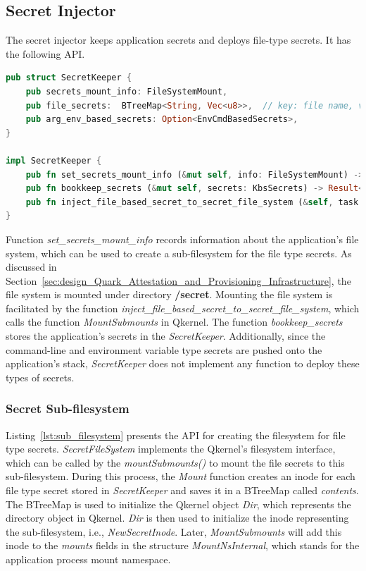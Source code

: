 \subsection{Secret Injector}
The secret injector keeps application secrets and deploys file-type secrets. It has the following API. 
\begin{lstlisting}[language=rust, caption= API for Secret Injector, label={lst:Secret_injector}]
pub struct SecretKeeper {
    pub secrets_mount_info: FileSystemMount,
    pub file_secrets:  BTreeMap<String, Vec<u8>>,  // key: file name, value: secret
    pub arg_env_based_secrets: Option<EnvCmdBasedSecrets>,
}

impl SecretKeeper {
    pub fn set_secrets_mount_info (&mut self, info: FileSystemMount) -> Result<()>
    pub fn bookkeep_secrets (&mut self, secrets: KbsSecrets) -> Result<()>
    pub fn inject_file_based_secret_to_secret_file_system (&self, task: &Task) -> Result<()>
}   
\end{lstlisting}

Function \emph{set\_secrets\_mount\_info} records information about the application's file system, which can be used to create a sub-filesystem for the file type secrets. As discussed in Section~\ref{sec:design_Quark_Attestation_and_Provisioning_Infrastructure}, the file system is mounted under 
directory \textbf{/secret}. Mounting the file system is facilitated by the function \emph{inject\_file\_based\_secret\_to\_secret\_file\_system}, which calls the function \emph{MountSubmounts} in Qkernel. The function \emph{bookkeep\_secrets} stores the application's secrets in the \emph{SecretKeeper}. 
Additionally, since the command-line and environment variable type secrets are pushed onto the application's stack,  \emph{SecretKeeper} does not implement any function to deploy these types of secrets.

\subsubsection{Secret Sub-filesystem}
Listing~\ref{lst:sub_filesystem} presents the API for creating the filesystem for file type secrets. \emph{SecretFileSystem} implements the  Qkernel's filesystem interface, which can be called by the \emph{mountSubmounts()} to mount the file secrets to this sub-filesystem.  During this process, 
the \emph{Mount} function creates an inode for each file type secret stored in \emph{SecretKeeper} and saves it in a BTreeMap called \emph{contents}. The BTreeMap is used to initialize the Qkernel object \emph{Dir}, which represents the directory object in Qkernel. \emph{Dir} is then used to 
initialize the inode representing the sub-filesystem, i.e., \emph{NewSecretInode}. Later, \emph{MountSubmounts} will add this inode to the \emph{mounts} fields in the structure\emph{ MountNsInternal}, which stands for the application process mount namespace.

